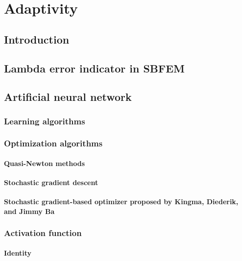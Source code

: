 
\chapter{Adaptivity}

\section{Introduction}

\section{Lambda error indicator in SBFEM}

\section{Artificial neural network}

    \subsection{Learning algorithms}

    \subsection{Optimization algorithms}

        \subsubsection{Quasi-Newton methods}

        \subsubsection{Stochastic gradient descent}

        \subsubsection{Stochastic gradient-based optimizer proposed by Kingma, Diederik, and Jimmy Ba}

    \subsection{Activation function}

        \subsubsection{Identity}


